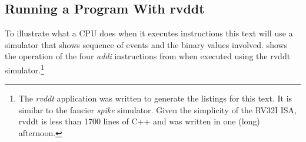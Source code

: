 \subsection{Running a Program With rvddt}

To illustrate what a CPU does when it executes instructions this text
will use a simulator that shows sequence of events and the binary values
involved.   shows the operation of the four 
{\em addi} instructions from  when executed using the 
\gls{rvddt} simulator.\footnote{The {\em rvddt} application was written to 
generate the listings for this text.  It is similar to the fancier
{\em spike} simulator.  Given the simplicity of the RV32I ISA, rvddt 
is less than 1700 lines of C++ and was written in one (long) afternoon.}


